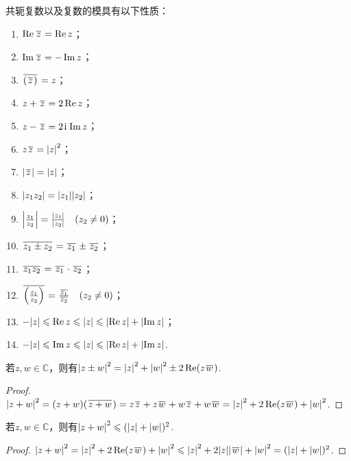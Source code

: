 \begin{property}
共轭复数以及复数的模具有以下性质：
\begin{enumerate}
\item \(\Re \kern1pt\overline{z}\kern1pt = \Re z\)；
\item \(\Im \kern1pt\overline{z}\kern1pt = -\Im z\)；
\item \(\kern1pt\overline{(\kern1pt\overline{z}\kern1pt)}\kern1pt = z\)；
\item \(z+\kern1pt\overline{z}\kern1pt = 2 \Re z\)；
\item \(z-\kern1pt\overline{z}\kern1pt = 2\kern1pt\mathrm{i}\kern1pt \Im z\)；
\item \(z\kern1pt\overline{z}\kern1pt = \abs{z}^2\)；
\item \(\abs{\kern1pt\overline{z}\kern1pt}=\abs{z}\)；
\item \(\abs{z_1 z_2} = \abs{z_1} \abs{z_2}\)；
\item \(\abs{\frac{z_1}{z_2}} = \frac{\abs{z_1}}{\abs{z_2}} \quad(z_2 \neq 0)\)；
\item \(\kern1pt\overline{z_1 \pm z_2}\kern1pt = \kern1pt\overline{z_1}\kern1pt \pm \kern1pt\overline{z_2}\kern1pt\)；
\item \(\kern1pt\overline{z_1 z_2}\kern1pt = \kern1pt\overline{z_1}\kern1pt \cdot \kern1pt\overline{z_2}\kern1pt\)；
\item \(\kern1pt\overline{\left(\frac{z_1}{z_2}\right)}\kern1pt = \frac{\kern1pt\overline{z_1}\kern1pt}{\kern1pt\overline{z_2}\kern1pt} \quad (z_2 \neq 0)\)；
\item \(-\abs{z} \leqslant \Re z \leqslant \abs{z} \leqslant \abs{\Re z} + \abs{\Im z}\)；
\item \(-\abs{z} \leqslant \Im z \leqslant \abs{z} \leqslant \abs{\Re z} + \abs{\Im z}\).
\end{enumerate}
\end{property}

\begin{theorem}
若\(z,w \in \mathbb{C}\)，则有\(\abs{z \pm w}^2 = \abs{z}^2 + \abs{w}^2 \pm 2 \Re(z \kern1pt\overline{w}\kern1pt)\).
\begin{proof}
\(
\abs{z + w}^2
= (z + w) (\kern1pt\overline{z + w}\kern1pt)
= z\kern1pt\overline{z}\kern1pt + z\kern1pt\overline{w}\kern1pt + w\kern1pt\overline{z}\kern1pt + w\kern1pt\overline{w}\kern1pt
= \abs{z}^2 + 2 \Re(z\kern1pt\overline{w}\kern1pt) + \abs{w}^2
\).
\end{proof}
\end{theorem}

\begin{theorem}
若\(z,w \in \mathbb{C}\)，则有\(\abs{z + w}^2 \leqslant (\abs{z} + \abs{w})^2\).
\begin{proof}
\(
\abs{z + w}^2
= \abs{z}^2 + 2 \Re(z \kern1pt\overline{w}\kern1pt) + \abs{w}^2
\leqslant \abs{z}^2 + 2 \abs{z}\abs{\kern1pt\overline{w}\kern1pt} + \abs{w}^2
= (\abs{z} + \abs{w})^2
\).
\end{proof}
\end{theorem}

